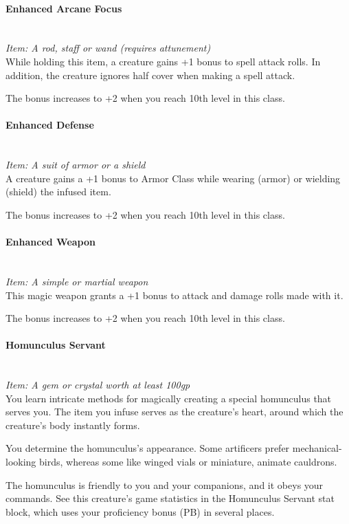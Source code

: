 \documentclass[letterpaper,openany,oneside,twocolumn]{book}
\begin{document}
\paragraph*{Enhanced Arcane Focus}\hfill\\
\textit{Item: A rod, staff or wand (requires attunement)}\\
While holding this item, a creature gains +1 bonus to spell attack rolls. In addition, the creature ignores half cover when making a spell attack.

The bonus increases to +2 when you reach 10th level in this class.
\paragraph*{Enhanced Defense}\hfill\\
\textit{Item: A suit of armor or a shield}\\
A creature gains a +1 bonus to Armor Class while wearing (armor) or wielding (shield) the infused item.

The bonus increases to +2 when you reach 10th level in this class.
\paragraph*{Enhanced Weapon}\hfill\\
\textit{Item: A simple or martial weapon}\\
This magic weapon grants a +1 bonus to attack and damage rolls made with it.

The bonus increases to +2 when you reach 10th level in this class.
\paragraph*{Homunculus Servant}\hfill\\
\textit{Item: A gem or crystal worth at least 100gp}\\
You learn intricate methods for magically creating a special homunculus that serves you. The item you infuse serves as the creature's heart, around which the creature's body instantly forms.

You determine the homunculus's appearance. Some artificers prefer mechanical-looking birds, whereas some like winged vials or miniature, animate cauldrons.

The homunculus is friendly to you and your companions, and it obeys your commands. See this creature's game statistics in the Homunculus Servant stat block, which uses your proficiency bonus (PB) in several places.
\end{document}
